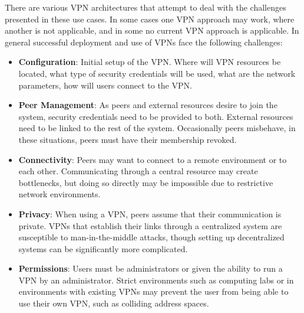 There are various VPN architectures that attempt to deal with the challenges
presented in these use cases.  In some cases one VPN approach may work,
where another is not applicable, and in some no current VPN approach is
applicable.  In general successful deployment and use of VPNs face the
following challenges:  
\begin{itemize}
\item \textbf{Configuration}:  Initial setup of the VPN.  Where will VPN
resources be located, what type of security credentials will be used, what are
the network parameters, how will users connect to the VPN.
\item \textbf{Peer Management}:  As peers and external resources desire to join
the system, security credentials need to be provided to both.  External
resources need to be linked to the rest of the system.  Occasionally peers
misbehave, in these situations, peers must have their membership revoked.
\item \textbf{Connectivity}:  Peers may want to connect to a remote environment
or to each other.  Communicating through a central resource may create
bottlenecks, but doing so directly may be impossible due to restrictive network
environments.
\item \textbf{Privacy}:  When using a VPN, peers assume that their communication
is private.  VPNs that establish their links through a centralized system are
susceptible to man-in-the-middle attacks, though setting up decentralized
systems can be significantly more complicated.
\item \textbf{Permissions}:  Users must be administrators or given the ability
to run a VPN by an administrator.  Strict environments such as computing labs
or in environments with existing VPNs may prevent the user from being able
to use their own VPN, such as colliding address spaces.
\end{itemize}

